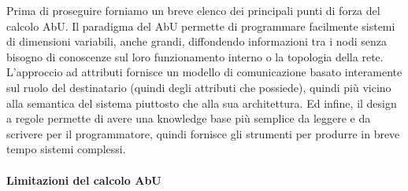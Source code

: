 \documentclass[target=bach]{thud}
\begin{document}
Prima di proseguire forniamo un breve elenco dei principali punti di forza del calcolo AbU. Il paradigma del AbU permette di programmare facilmente sistemi di dimensioni variabili, anche grandi, diffondendo informazioni tra i nodi senza bisogno di conoscenze sul loro funzionamento interno o la topologia della rete.
L'approccio ad attributi fornisce un modello di comunicazione basato interamente sul ruolo del destinatario (quindi degli attributi che possiede), quindi più vicino alla semantica del sistema piuttosto che alla sua architettura.
Ed infine, il design a regole permette di avere una knowledge base più semplice da leggere e da scrivere per il programmatore, quindi fornisce gli strumenti per produrre in breve tempo sistemi complessi.

\paragraph{Limitazioni del calcolo AbU}
\end{document}
